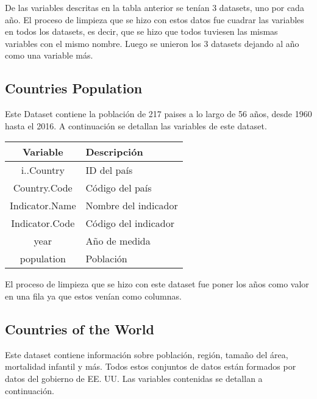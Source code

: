 \documentclass[]{article}
\begin{document}
De las variables descritas en la tabla anterior se tenían 3 datasets,
uno por cada año. El proceso de limpieza que se hizo con estos datos fue
cuadrar las variables en todos los datasets, es decir, que se hizo que
todos tuviesen las mismas variables con el mismo nombre. Luego se
unieron los 3 datasets dejando al año como una variable más.

\subsection{Countries Population}\label{countries-population}

Este Dataset contiene la población de 217 paises a lo largo de 56 años,
desde 1960 hasta el 2016. A continuación se detallan las variables de
este dataset.

\begin{center}
\begin{tabularx}{\linewidth}{ |c|X|} 
 \hline
 \textbf{Variable} & \textbf{Descripción}\\
 \hline
 i..Country & ID del país\\
 \hline
 Country.Code & Código del país\\
 \hline
 Indicator.Name & Nombre del indicador \\
 \hline
 Indicator.Code & Código del indicador \\
 \hline
 year & Año de medida \\
 \hline
 population & Población \\
 \hline
 \hline
\end{tabularx}
\end{center}

El proceso de limpieza que se hizo con este dataset fue poner los años
como valor en una fila ya que estos venían como columnas.

\subsection{Countries of the World}\label{countries-of-the-world}

Este dataset contiene información sobre población, región, tamaño del
área, mortalidad infantil y más. Todos estos conjuntos de datos están
formados por datos del gobierno de EE. UU. Las variables contenidas se
detallan a continuación.
\end{document}
